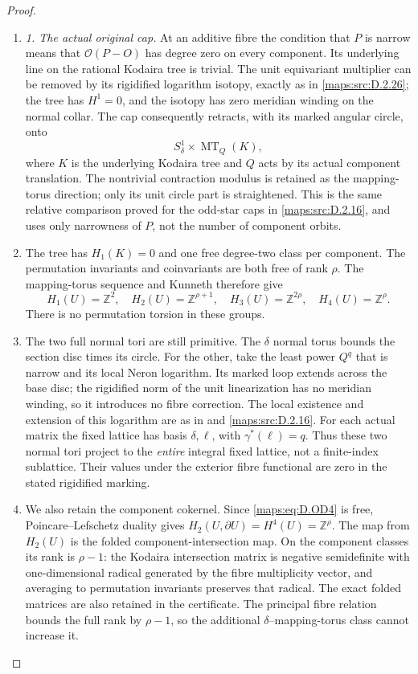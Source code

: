 \begin{proof}
\begin{enumerate}[label=\arabic*.,leftmargin=*]
\item \emph{1. The actual original cap.}
At an additive fibre the condition that $P$ is narrow means
that $\mathcal O(P-O)$ has degree zero on every component.
Its underlying line on the rational Kodaira tree is trivial.
The unit equivariant multiplier can be removed by its
rigidified logarithm isotopy, exactly as in \ref{maps:src:D.2.26}; the tree
has $H^1=0$, and the isotopy has zero meridian winding on the
normal collar. The cap consequently retracts, with its marked
angular circle, onto
\[
 S^1_\delta\times\operatorname{MT}_Q(K),
\]
where $K$ is the underlying Kodaira tree and $Q$ acts by its
actual component translation. The nontrivial contraction
modulus is retained as the mapping-torus direction; only its
unit circle part is straightened. This is the same relative
comparison proved for the odd-star caps in \ref{maps:src:D.2.16}, and uses
only narrowness of $P$, not the number of component orbits.

\item The tree has $H_1(K)=0$ and one free degree-two class per
component. The permutation invariants and coinvariants are
both free of rank $\rho$. The mapping-torus sequence and
Kunneth therefore give
\[
 H_1(U)=\mathbb Z^2,\quad H_2(U)=\mathbb Z^{\rho+1},\quad
 H_3(U)=\mathbb Z^{2\rho},\quad H_4(U)=\mathbb Z^\rho.
                                                               \tag{D.OD4}\label{maps:eq:D.OD4}
\]
There is no permutation torsion in these groups.

\item The two full normal tori are still primitive. The $\delta$
normal torus bounds the section disc times its circle. For
the other, take the least power $Q^q$ that is narrow and its
local Neron logarithm. Its marked loop extends across the
base disc; the rigidified norm of the unit linearization has
no meridian winding, so it introduces no fibre correction.
The local existence and extension of this logarithm are as
in \cite[Section 2.4, equation (2.2)]{manUU21} and \ref{maps:src:D.2.16}.
For each actual matrix the fixed lattice has basis
$\delta,\ell$, with $\gamma^*(\ell)=q$. Thus these two
normal tori project to the \emph{entire} integral fixed
lattice, not a finite-index sublattice. Their values under
the exterior fibre functional are zero in the stated
rigidified marking.

\item We also retain the component cokernel. Since \eqref{maps:eq:D.OD4} is free,
Poincare--Lefschetz duality gives
$H_2(U,\partial U)=H^4(U)=\mathbb Z^\rho$.
The map from $H_2(U)$ is the folded component-intersection
map. On the component classes its rank is $\rho-1$:
the Kodaira intersection matrix is negative semidefinite
with one-dimensional radical generated by the fibre
multiplicity vector, and averaging to permutation invariants
preserves that radical. The exact folded matrices are also
retained in the certificate. The principal fibre relation
bounds the full rank by $\rho-1$, so the additional
$\delta$--mapping-torus class cannot increase it.


\end{enumerate}
\end{proof}
